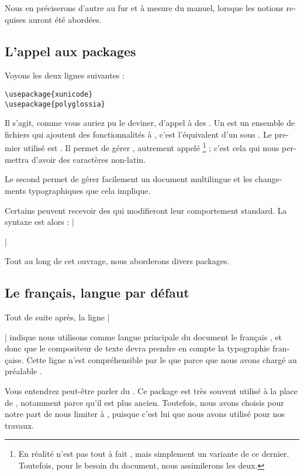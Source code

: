 Nous en préciserons d'autre au fur et à mesure du manuel, lorsque les notions requises auront été abordées.

\subsection{L'appel aux packages}

Voyons les deux lignes suivantes : 
\begin{verbatim}
\usepackage{xunicode}
\usepackage{polyglossia}
\end{verbatim}

Il s'agit, comme vous auriez pu le deviner, d'appel à des . Un  est un ensemble de fichiers qui ajoutent des fonctionnalités à , c'est l'équivalent d'un  sous . Le premier  utilisé est . Il permet de gérer , autrement appelé \footnote{En réalité  n'est pas tout à fait , mais simplement un variante de ce dernier. Toutefois, pour le besoin du document, nous assimilerons les deux.} ; c'est cela qui nous permettra d'avoir des caractères non-latin.

Le second permet de gérer facilement un document multilingue et les changements typographiques que cela implique.

Certains  peuvent recevoir des  qui modifieront leur comportement standard. La syntaxe est alors : |\usepackage[options]{package}|

Tout au long de cet ouvrage, nous aborderons divers packages.

\subsection{Le fran\c cais, langue par défaut}

Tout de suite après, la ligne |\setmainlanguage{french}| indique nous utilisons comme langue principale du document le fran\c cais , et donc que le compositeur de texte devra prendre en compte la typographie fran\c caise. Cette ligne n'est compréhensible par le  que parce que nous avons chargé au préalable .

\begin{anedocte}
Vous entendrez peut-être parler du  . Ce package est très souvent utilisé à la place de , notamment parce qu'il est plus ancien. Toutefois, nous avons choisis pour notre part de nous limiter à , puisque c'est lui que nous avons utilisé pour nos travaux.


\end{anedocte}

